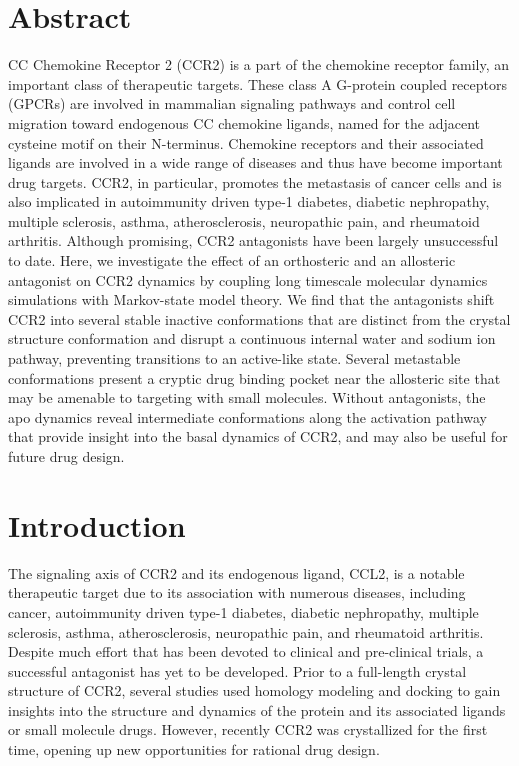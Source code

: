 
\section{Abstract}
CC Chemokine Receptor 2 (CCR2) is a part of the chemokine receptor family, an important class of therapeutic targets.
These class A G-protein coupled receptors (GPCRs) are involved in mammalian signaling pathways and control cell migration toward endogenous CC chemokine ligands, named for the adjacent cysteine motif on their N-terminus.
Chemokine receptors and their associated ligands are involved in a wide range of diseases and thus have become important drug targets.
CCR2, in particular, promotes the metastasis of cancer cells and is also implicated in autoimmunity driven type-1 diabetes, diabetic nephropathy, multiple sclerosis, asthma, atherosclerosis, neuropathic pain, and rheumatoid arthritis.
Although promising, CCR2 antagonists have been largely unsuccessful to date.
Here, we investigate the effect of an orthosteric and an allosteric antagonist on CCR2 dynamics by coupling long timescale molecular dynamics simulations with Markov-state model theory.
We find that the antagonists shift CCR2 into several stable inactive conformations that are distinct from the crystal structure conformation and disrupt a continuous internal water and sodium ion pathway, preventing transitions to an active-like state.
Several metastable conformations present a cryptic drug binding pocket near the allosteric site that may be amenable to targeting with small molecules.
Without antagonists, the apo dynamics reveal intermediate conformations along the activation pathway that provide insight into the basal dynamics of CCR2, and may also be useful for future drug design.

\section{Introduction}

The signaling axis of CCR2 and its endogenous ligand, CCL2, is a notable therapeutic target due to its association with numerous diseases, including cancer, autoimmunity driven type-1 diabetes, diabetic nephropathy, multiple sclerosis, asthma, atherosclerosis, neuropathic pain, and rheumatoid arthritis\cite{Ben-Baruch2006,OConnor2015,Solomon2010}.
Despite much effort that has been devoted to clinical and pre-clinical trials, a successful antagonist has yet to be developed\cite{Scholten2012,Lim2016,Solari2015,Horuk2009}.
Prior to a full-length crystal structure of CCR2, several studies used homology modeling and docking to gain insights into the structure and dynamics of the protein and its associated ligands or small molecule drugs\cite{Shahlaei2013,Chavan2012,Kothandan2012}.
However, recently CCR2 was crystallized for the first time\cite{Zheng2016}, opening up new opportunities for rational drug design.


